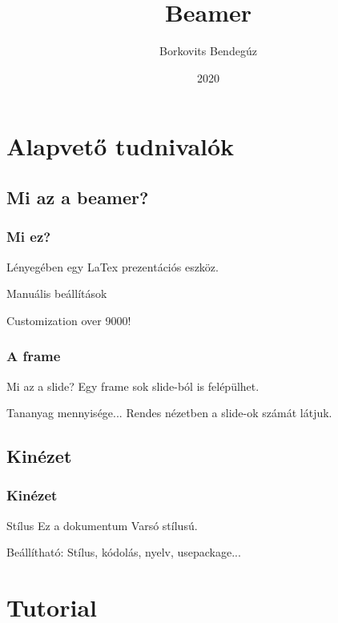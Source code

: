 \documentclass[11pt]{beamer}
\author{Borkovits Bendegúz}
\title{Beamer}
\institute{ELTE}
\date{2020}
\begin{document}

\begin{frame}
\titlepage
\end{frame}

\section{Alapvető tudnivalók}

\subsection{Mi az a beamer?}

\begin{frame}
\frametitle{Mi ez?}
Lényegében egy \alert{LaTex} prezentációs eszköz.

Manuális beállítások

Customization over 9000!
\end{frame}

\begin{frame}
\frametitle{A frame}
\begin{block}{Mi az a slide?}
Egy frame sok  \pause
slide-ból is felépülhet. \pause
\end{block}
\begin{alertblock}{Tananyag mennyisége...}
Rendes nézetben a \alert{slide}-ok számát látjuk.
\end{alertblock}

\end{frame}

\subsection{Kinézet}

\begin{frame}
\frametitle{Kinézet}
\begin{block}{Stílus}
Ez a dokumentum Varsó stílusú.
\end{block}

\begin{block}{Beállítható:}
Stílus, kódolás, nyelv, usepackage...
\end{block}
\end{frame}

\section{Tutorial}
\end{document}
